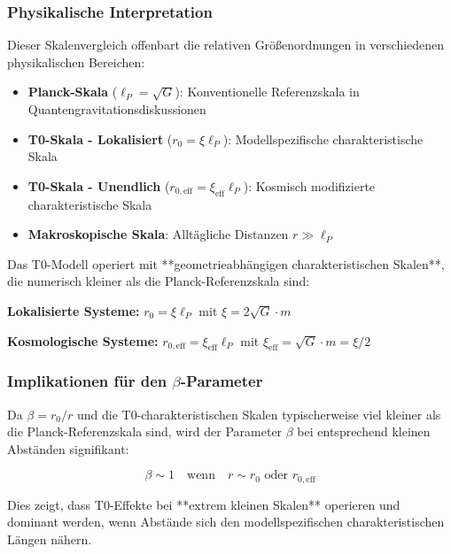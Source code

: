 \documentclass[12pt,a4paper]{article}
\begin{document}
\subsubsection{Physikalische Interpretation}
\label{subsubsec:physical_interpretation}

Dieser Skalenvergleich offenbart die relativen Größenordnungen in verschiedenen physikalischen Bereichen:

\begin{itemize}
	\item \textbf{Planck-Skala} ($\ell_P = \sqrt{G}$): Konventionelle Referenzskala in Quantengravitationsdiskussionen
	\item \textbf{T0-Skala - Lokalisiert} ($r_0 = \xi \ell_P$): Modellspezifische charakteristische Skala 
	\item \textbf{T0-Skala - Unendlich} ($r_{0,\text{eff}} = \xi_{\text{eff}} \ell_P$): Kosmisch modifizierte charakteristische Skala
	\item \textbf{Makroskopische Skala}: Alltägliche Distanzen $r \gg \ell_P$
\end{itemize}

Das T0-Modell operiert mit **geometrieabhängigen charakteristischen Skalen**, die numerisch kleiner als die Planck-Referenzskala sind:

\textbf{Lokalisierte Systeme:} $r_0 = \xi \ell_P$ mit $\xi = 2\sqrt{G} \cdot m$

\textbf{Kosmologische Systeme:} $r_{0,\text{eff}} = \xi_{\text{eff}} \ell_P$ mit $\xi_{\text{eff}} = \sqrt{G} \cdot m = \xi/2$

\subsubsection{Implikationen für den $\beta$-Parameter}
\label{subsubsec:beta_implications}

Da $\beta = r_0/r$ und die T0-charakteristischen Skalen typischerweise viel kleiner als die Planck-Referenzskala sind, wird der Parameter $\beta$ bei entsprechend kleinen Abständen signifikant:

\begin{equation}
	\beta \sim 1 \quad \text{wenn} \quad r \sim r_0 \text{ oder } r_{0,\text{eff}}
\end{equation}

Dies zeigt, dass T0-Effekte bei **extrem kleinen Skalen** operieren und dominant werden, wenn Abstände sich den modellspezifischen charakteristischen Längen nähern.
\end{document}
